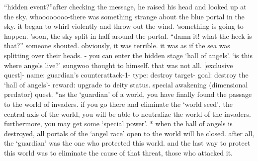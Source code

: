 “hidden event?”after checking the message, he raised his head and looked up at the sky.
whoooooooo-there was something strange about the blue portal in the sky.
 it began to whirl violently and throw out the wind.
‘something is going to happen.
’soon, the sky split in half around the portal.
“damn it! what the heck is that?” someone shouted.
obviously, it was terrible.
 it was as if the sea was splitting over their heads.
- you can enter the hidden stage ‘hall of angels’.
‘is this where angels live?’ sungwoo thought to himself.
that was not all.
[exclusive quest]- name: guardian’s counterattack-1- type: destroy target- goal: destroy the ‘hall of angels’- reward: upgrade to deity status.
 special awakening (dimensional predator) quest.
*as the ‘guardian’ of a world, you have finally found the passage to the world of invaders.
 if you go there and eliminate the ‘world seed’, the central axis of the world, you will be able to neutralize the world of the invaders.
 furthermore, you may get some ‘special power’.
* when the hall of angels is destroyed, all portals of the ‘angel race’ open to the world will be closed.
after all, the ‘guardian’ was the one who protected this world.
 and the last way to protect this world was to eliminate the cause of that threat, those who attacked it.


 